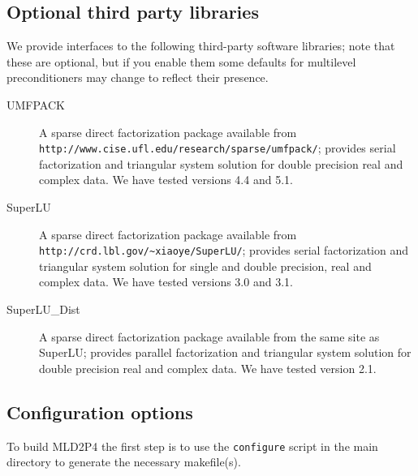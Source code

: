 \subsection{Optional third party libraries}

We provide interfaces to the following third-party software libraries;
note that these are optional, but if you enable them some defaults
for multilevel preconditioners may change to reflect their presence. 

\begin{description}
\item[UMFPACK] \cite{UMFPACK}
  A sparse direct factorization package available from \\ 
  \verb|http://www.cise.ufl.edu/research/sparse/umfpack/|; 
  provides serial factorization and triangular system solution for double
  precision real and complex data. We have tested
  versions 4.4 and 5.1. 
\item[SuperLU] \cite{SUPERLU}
  A sparse direct factorization package available from \\
  \verb|http://crd.lbl.gov/~xiaoye/SuperLU/|; provides serial
  factorization and triangular system solution for single and double precision,
  real and complex data. We have tested versions 3.0 and 3.1.
\item[SuperLU\_Dist] \cite{SUPERLUDIST}
  A sparse direct factorization package available
  from the same site as SuperLU; provides parallel factorization and
  triangular system solution for double precision real and complex data.
  We have tested version 2.1.
\end{description}

\subsection{Configuration options}

To build  MLD2P4 the first step is to use the \verb|configure| script
in the main directory to generate the necessary makefile(s). 

